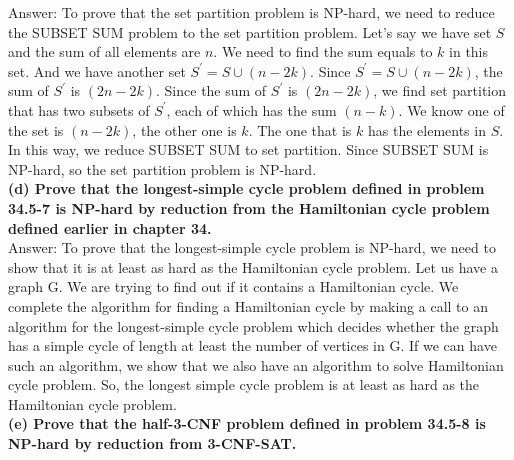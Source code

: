 \documentclass{article}
\begin{document}
Answer: To prove that the set partition problem is NP-hard, we need to reduce the SUBSET SUM problem to the set partition problem. Let's say we have set $S$ and the sum of all elements are $n$. We need to find the sum equals to $k$ in this set. And we have another set $S^{'} = S\cup (n-2k)$. Since $S^{'} = S\cup (n-2k)$, the sum of $S^{'}$ is $(2n-2k)$.  Since the sum of $S^{'}$ is $(2n-2k)$, we find set partition that has two subsets of $S^{'}$, each of which has the sum $(n-k)$. We know one of the set is $(n-2k)$, the other one is $k$. The one that is $k$ has the elements in $S$. In this way, we reduce SUBSET SUM to set partition. Since SUBSET SUM is NP-hard, so the set partition problem is NP-hard. \\ \newline
\textbf{(d) Prove that the longest-simple cycle problem defined in problem 34.5-7 is NP-hard by reduction from the Hamiltonian cycle problem defined earlier in chapter 34.} \\ \newline
Answer: To prove that the longest-simple cycle problem is NP-hard, we need to show that it is at least as hard as the Hamiltonian cycle problem. Let us have a graph G. We are trying to find out if it contains a Hamiltonian cycle. We complete the algorithm for finding a Hamiltonian cycle by making a call to an algorithm for the longest-simple cycle problem which decides whether the graph has a simple cycle of length at least the number of vertices in G. If we can have such an algorithm, we show that we also have an algorithm to solve Hamiltonian cycle problem. So, the longest simple cycle problem is at least as hard as the Hamiltonian cycle problem. \\ \newline 
\textbf{(e) Prove that the half-3-CNF problem defined in problem 34.5-8 is NP-hard by reduction from 3-CNF-SAT.} \\ \newline
\end{document}

